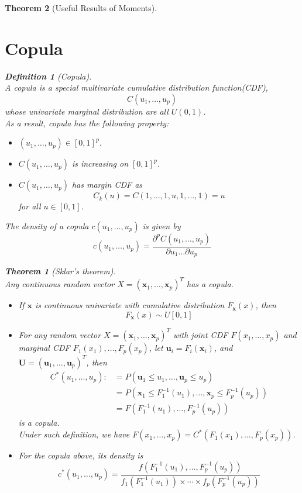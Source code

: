 \documentclass[12pt]{article}
\newtheorem{definition}{Definition}[section]
\newtheorem{theorem}{Theorem}[section]
\theoremstyle{definition}
\begin{document}
\begin{theorem}[Useful Results of Moments]
\section{Copula}
\begin{definition}[Copula]
\hfill\\\normalfont A copula is a special multivariate cumulative distribution function(CDF), 
\[
C(u_1, \ldots, u_p)
\]
whose univariate marginal distribution are all $U(0,1)$.\\
As a result, copula has the following property:
\begin{itemize}
  \item $(u_1, \ldots, u_p)\in [0,1]^p$.
  \item $C(u_1,\ldots, u_p)$ is increasing on $[0,1]^p$.
  \item $C(u_1,\ldots, u_p)$ has margin CDF as
  \[
C_k(u)=C(1,\ldots, 1, u, 1,\ldots, 1) = u
  \]
  for all $u\in [0,1]$.
\end{itemize}
The density of a copula $c(u_1,\ldots, u_p)$ is given by
\[
c(u_1,\ldots, u_p) = \frac{\partial^p C(u_1,\ldots, u_p)}{\partial u_1 \ldots \partial u_p}
\]
\end{definition}
\begin{theorem}[Sklar's theorem]
\hfill\\\normalfont Any continuous random vector $X=(\mathbf{x}_1,\ldots, \mathbf{x}_p)^T$ has a copula.
\begin{itemize}
  \item If $\mathbf{x}$ is continuous univariate with cumulative distribution $F_{\mathbf{x}}(x)$, then 
  \[
F_{\mathbf{x}}(x)\sim U[0,1]
  \]
  \item For any random vector $X=(\mathbf{x}_1,\ldots, \mathbf{x}_p)^T$ with joint CDF $F(x_1,\ldots, x_p)$ and marginal CDF $F_1(x_1),\ldots, F_p(x_p)$, let $\mathbf{u}_i=F_i(\mathbf{x}_i)$, and $\mathbf{U}=(\mathbf{u}_1,\ldots, \mathbf{u}_p)^T$, then
  \begin{align*}
C^\ast(u_1,\ldots, u_p):&=P(\mathbf{u}_1\leq u_1, \ldots, \mathbf{u}_p\leq u_p)\\
&=P(\mathbf{x}_1\leq F_1^{-1}(u_1),\ldots, \mathbf{x}_p\leq F_p^{-1}(u_p))\\
&=F(F_1^{-1}(u_1), \ldots,F_p^{-1}(u_p))
  \end{align*}
  is a copula.\\
  Under such definition, we have $F(x_1,\ldots, x_p)=C^\ast(F_1(x_1),\ldots, F_p(x_p))$.
  \item For the copula above, its density is
  \[
c^\ast(u_1,\ldots, u_p)=\frac{f(F_1^{-1}(u_1), \ldots, F_p^{-1}(u_p))}{f_1(F_1^{-1}(u_1))\times\cdots\times f_p(F_p^{-1}(u_p))}
\]
\end{itemize}
\end{theorem}
\end{theorem}
\end{document}
